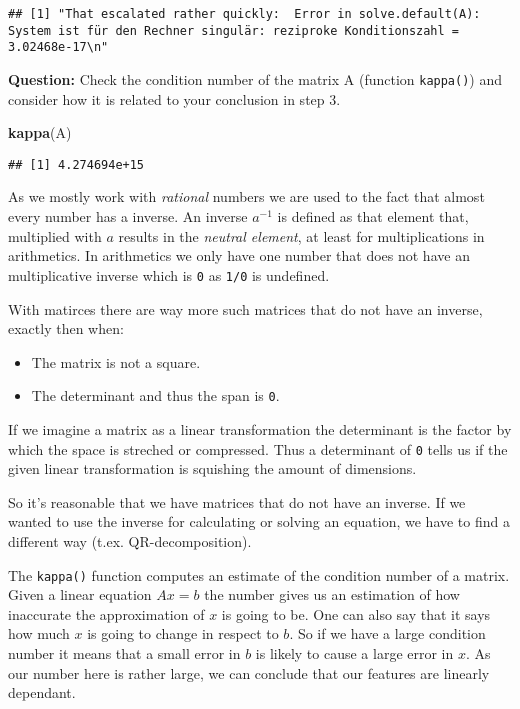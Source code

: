 \documentclass[]{article}
\newenvironment{Shaded}{\begin{snugshade}}{\end{snugshade}}
\newcommand{\KeywordTok}[1]{\textcolor[rgb]{0.13,0.29,0.53}{\textbf{#1}}}
\newcommand{\NormalTok}[1]{#1}
\providecommand{\tightlist}{%
  \setlength{\itemsep}{0pt}\setlength{\parskip}{0pt}}
\begin{document}
\begin{verbatim}
## [1] "That escalated rather quickly:  Error in solve.default(A): System ist für den Rechner singulär: reziproke Konditionszahl = 3.02468e-17\n"
\end{verbatim}

\textbf{Question:} Check the condition number of the matrix A (function
\texttt{kappa()}) and consider how it is related to your conclusion in
step 3.

\begin{Shaded}
\begin{Highlighting}[]
\KeywordTok{kappa}\NormalTok{(A)}
\end{Highlighting}
\end{Shaded}

\begin{verbatim}
## [1] 4.274694e+15
\end{verbatim}

As we mostly work with \emph{rational} numbers we are used to the fact
that almost every number has a inverse. An inverse \(a^{-1}\) is defined
as that element that, multiplied with \(a\) results in the \emph{neutral
element}, at least for multiplications in arithmetics. In arithmetics we
only have one number that does not have an multiplicative inverse which
is \texttt{0} as \texttt{1/0} is undefined.

With matirces there are way more such matrices that do not have an
inverse, exactly then when:

\begin{itemize}
\tightlist
\item
  The matrix is not a square.
\item
  The determinant and thus the span is \texttt{0}.
\end{itemize}

If we imagine a matrix as a linear transformation the determinant is the
factor by which the space is streched or compressed. Thus a determinant
of \texttt{0} tells us if the given linear transformation is squishing
the amount of dimensions.

So it's reasonable that we have matrices that do not have an inverse. If
we wanted to use the inverse for calculating or solving an equation, we
have to find a different way (t.ex. QR-decomposition).

The \texttt{kappa()} function computes an estimate of the condition
number of a matrix. Given a linear equation \(Ax = b\) the number gives
us an estimation of how inaccurate the approximation of \(x\) is going
to be. One can also say that it says how much \(x\) is going to change
in respect to \(b\). So if we have a large condition number it means
that a small error in \(b\) is likely to cause a large error in \(x\).
As our number here is rather large, we can conclude that our features
are linearly dependant.
\end{document}
